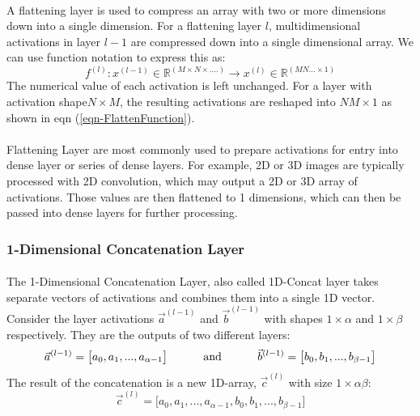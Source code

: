 \documentclass[12pt,letterpaper]{article}
\begin{document}
\paragraph*{}A flattening layer is used to compress an array with two or more dimensions down into a single dimension. For a flattening layer $l$, multidimensional activations in layer $l-1$ are compressed down into a single dimensional array. We can use function notation to express this as:
\begin{equation}
\label{eqn-FlattenFunction}
f^{(l)} : x^{(l-1)} \in \mathbb{R}^{(M \times N \times ....)} \rightarrow
x^{(l)} \in \mathbb{R}^{(MN...\times 1)}
\end{equation}
The numerical value of each activation is left unchanged. For a layer with activation shape$N \times M$, the resulting activations are reshaped into $NM \times 1$ as shown in eqn (\ref{eqn-FlattenFunction}).

\paragraph*{}Flattening Layer are most commonly used to prepare activations for entry into dense layer or series of dense layers. For example, 2D or 3D images are typically processed with 2D convolution, which may output a 2D or 3D array of activations. Those values are then flattened to 1 dimensions, which can then be passed into dense layers for further processing.


\subsubsection{1-Dimensional Concatenation Layer}

\paragraph*{}The 1-Dimensional Concatenation Layer, also called 1D-Concat layer takes separate vectors of activations and combines them into a single 1D vector. Consider the layer activations $\vec{a}^{(l-1)}$ and $\vec{b}^{(l-1)}$ with shapes  $1 \times \alpha$ and $1 \times \beta$ respectively. They are the outputs of two different layers:
\begin{equation}
\vec{a}^{(l-1)} = \big[ a_{0},  a_{1}, ... ,  a_{\alpha-1} \big]
\text{\hspace{1cm} and \hspace{1cm}}
\vec{b}^{(l-1)} = \big[ b_{0},  b_{1}, ... ,  b_{\beta-1} \big]
\end{equation}
The result of the concatenation is a new 1D-array, $\vec{c}^{(l)}$ with size $1 \times \alpha\beta$:
\begin{equation}
\vec{c}^{(l)} = \big[ a_{0},  a_{1}, ... ,  a_{\alpha-1}, b_{0},  b_{1}, ... ,  b_{\beta-1} \big]
\end{equation}
\end{document}

